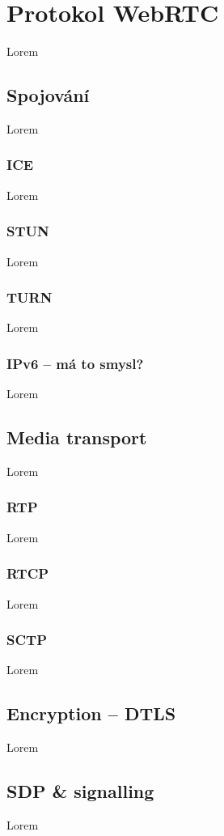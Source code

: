 \section{Protokol WebRTC}

Lorem

\subsection{Spojování}

Lorem

\subsubsection{ICE}

Lorem

\subsubsection{STUN}

Lorem

\subsubsection{TURN}

Lorem

\subsubsection{IPv6 -- má to smysl?}

Lorem

\subsection{Media transport}

Lorem

\subsubsection{RTP}

Lorem

\subsubsection{RTCP}

Lorem

\subsubsection{SCTP}

Lorem

\subsection{Encryption -- DTLS}

Lorem

\subsection{SDP \& signalling}

Lorem
